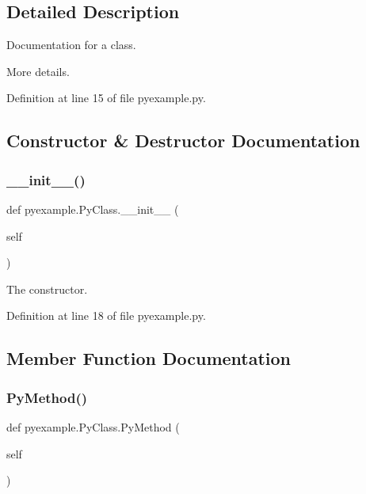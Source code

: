 \subsection{Detailed Description}
Documentation for a class. 

More details. 

Definition at line 15 of file pyexample.\+py.



\subsection{Constructor \& Destructor Documentation}
\mbox{\label{classpyexample_1_1_py_class_a87e20fe7e81cb5a1c04e620c076ab8ac}} 
\subsubsection{\texorpdfstring{\_\_init\_\_()}{\_\_init\_\_()}}
{\footnotesize\ttfamily def pyexample.\+Py\+Class.\+\_\+\+\_\+init\+\_\+\+\_\+ (\begin{DoxyParamCaption}\item[{}]{self }\end{DoxyParamCaption})}



The constructor. 



Definition at line 18 of file pyexample.\+py.


\begin{DoxyCode}{0}

\end{DoxyCode}


\subsection{Member Function Documentation}
\mbox{\label{classpyexample_1_1_py_class_a654596774eb28a0c6d26eea565de3a9d}} 
\subsubsection{\texorpdfstring{PyMethod()}{PyMethod()}}
{\footnotesize\ttfamily def pyexample.\+Py\+Class.\+Py\+Method (\begin{DoxyParamCaption}\item[{}]{self }\end{DoxyParamCaption})}



